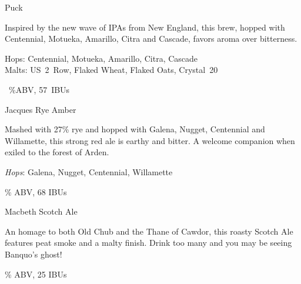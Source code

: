 \documentclass[12pt]{article}
\begin{document}
\begin{flushleft}

{\Huge Puck}

{\large
Inspired by the new wave of IPAs from New England, this brew, 
hopped with Centennial, Motueka, Amarillo, Citra and Cascade, 
favors aroma over bitterness.

Hops: Centennial, Motueka, Amarillo, Citra, Cascade \\
Malts: US~2~Row, Flaked Wheat, Flaked Oats, Crystal~20

~\%ABV, 57~IBUs
}

% 
{\Huge Jacques Rye Amber}

{\large
  Mashed with 27\% rye and hopped with Galena, Nugget, Centennial 
  and Willamette, this strong red ale is earthy and bitter.  A welcome 
  companion when exiled to the forest of Arden.

  \textit{Hops}: Galena, Nugget, Centennial, Willamette

   \% ABV, 68 IBUs
}

{\Huge Macbeth Scotch Ale}

{\large
  An homage to both Old Chub and the Thane of Cawdor, this roasty 
  Scotch Ale features peat smoke and a malty finish.  Drink too 
  many and you may be seeing Banquo's ghost!

   \% ABV, 25 IBUs
}
\end{flushleft}
\end{document}

